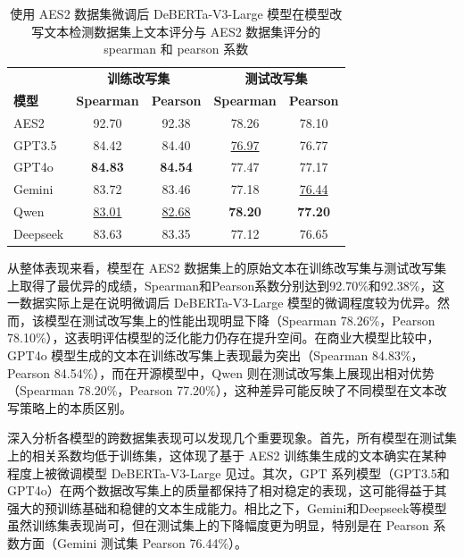 \begin{table}[htbp]
\centering
\caption{使用 AES2 数据集微调后 DeBERTa-V3-Large 模型在模型改写文本检测数据集上文本评分与 AES2 数据集评分的 spearman 和 pearson 系数}
\begin{tabular}{l|cc|cc}
\toprule
\textbf{} & \multicolumn{2}{c}{\textbf{训练改写集}}    & \multicolumn{2}{c}{\textbf{测试改写集}} \\
\textbf{模型} & \textbf{Spearman}  & \textbf{Pearson} & \textbf{Spearman} & \textbf{Pearson}  \\ \midrule
AES2      & 92.70              & 92.38            & 78.26             & 78.10             \\
GPT3.5    & 84.42              & 84.40            & \uline{76.97}     & 76.77             \\
GPT4o     & \textbf{84.83}     & \textbf{84.54}   & 77.47             & 77.17             \\
Gemini    & 83.72              & 83.46            & 77.18             & \uline{76.44}     \\
Qwen      & \uline{83.01}      & \uline{82.68}    & \textbf{78.20}    & \textbf{77.20}    \\
Deepseek  & 83.63              & 83.35            & 77.12             & 76.65             \\ \bottomrule
\end{tabular}
\label{tab:spearman}
\end{table}

从整体表现来看，模型在 AES2 数据集上的原始文本在训练改写集与测试改写集上取得了最优异的成绩，Spearman和Pearson系数分别达到92.70\%和92.38\%，这一数据实际上是在说明微调后 DeBERTa-V3-Large 模型的微调程度较为优异。然而，该模型在测试改写集上的性能出现明显下降（Spearman 78.26\%，Pearson 78.10\%），这表明评估模型的泛化能力仍存在提升空间。在商业大模型比较中，GPT4o 模型生成的文本在训练改写集上表现最为突出（Spearman 84.83\%，Pearson 84.54\%），而在开源模型中，Qwen 则在测试改写集上展现出相对优势（Spearman 78.20\%，Pearson 77.20\%），这种差异可能反映了不同模型在文本改写策略上的本质区别。

深入分析各模型的跨数据集表现可以发现几个重要现象。首先，所有模型在测试集上的相关系数均低于训练集，这体现了基于 AES2 训练集生成的文本确实在某种程度上被微调模型 DeBERTa-V3-Large 见过。其次，GPT 系列模型（GPT3.5和GPT4o）在两个数据改写集上的质量都保持了相对稳定的表现，这可能得益于其强大的预训练基础和稳健的文本生成能力。相比之下，Gemini和Deepseek等模型虽然训练集表现尚可，但在测试集上的下降幅度更为明显，特别是在 Pearson 系数方面（Gemini 测试集 Pearson 76.44\%）。

